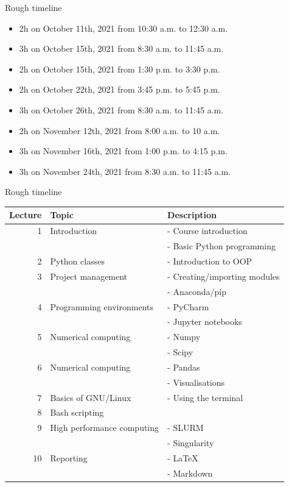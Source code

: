 \documentclass[10pt]{beamer}
\begin{document}
\begin{frame}[label={sec:org4d3c891}]{Rough timeline}
\begin{itemize}
\item 2h on October 11th, 2021 from 10:30 a.m. to 12:30 a.m.
\item 3h on October 15th, 2021 from 8:30 a.m. to 11:45 a.m.
\item 2h on October 15th, 2021 from 1:30 p.m. to 3:30 p.m.
\item 2h on October 22th, 2021 from 3:45 p.m. to 5:45 p.m.
\item 3h on October 26th, 2021 from 8:30 a.m. to 11:45 a.m.
\item 2h on November 12th, 2021 from 8:00 a.m. to 10 a.m.
\item 3h on November 16th, 2021 from 1:00 p.m. to 4:15 p.m.
\item 3h on November 24th, 2021 from 8:30 a.m. to 11:45 a.m.
\end{itemize}
\end{frame}

\begin{frame}[label={sec:orgd21cabb}]{Rough timeline}
\begin{center}
\scriptsize
\begin{tabular}{rll}
\hline
Lecture & Topic & Description\\
\hline
1 & Introduction & - Course introduction\\
 &  & - Basic Python programming\\
2 & Python classes & - Introduction to OOP\\
3 & Project management & - Creating/importing modules\\
 &  & - Anaconda/pip\\
4 & Programming environments & - PyCharm\\
 &  & - Jupyter notebooks\\
5 & Numerical computing & - Numpy\\
 &  & - Scipy\\
6 & Numerical computing & - Pandas\\
 &  & - Visualisations\\
7 & Basics of GNU/Linux & - Using the terminal\\
8 & Bash scripting & \\
9 & High performance computing & - SLURM\\
 &  & - Singularity\\
10 & Reporting & - \LaTeX{}\\
 &  & - Markdown\\
\hline
\end{tabular}
\end{center}
\end{frame}
\end{document}
